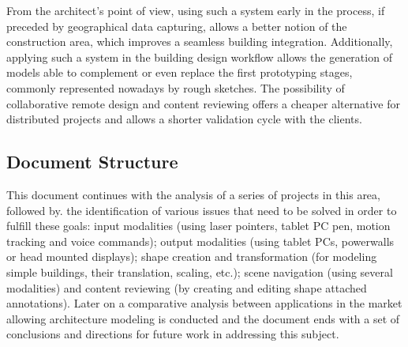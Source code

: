 From the architect's point of view, using such a system early in the process,
if preceded by geographical data capturing,
allows a better notion of the construction area, which improves a seamless building integration.
Additionally, applying such a system in the building design workflow allows
the generation of models able to complement or even replace the first prototyping stages,
commonly represented nowadays by rough sketches.
The possibility of collaborative remote design and content reviewing offers a cheaper
alternative for distributed projects and allows a shorter validation cycle with the clients.

\subsection{Document Structure}
This document continues with
the analysis of a series of projects in this area, followed by.
the identification of various issues that need to be solved in order to fulfill these goals:
input modalities (using laser pointers, tablet PC pen, motion tracking and voice commands);
output modalities (using tablet PCs, powerwalls or head mounted displays);
shape creation and transformation (for modeling simple buildings, their translation, scaling, etc.);
scene navigation (using several modalities) and
content reviewing (by creating and editing shape attached annotations).
Later on a comparative analysis between applications in the market allowing architecture modeling is conducted
and the document ends with a set of conclusions and directions for future work in addressing this subject.
